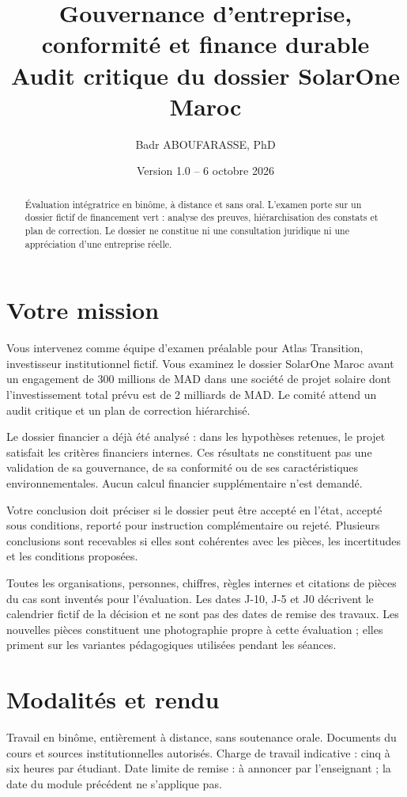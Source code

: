 \documentclass[11pt,a4paper]{article}
\title{\Large Gouvernance d’entreprise, conformité et finance durable\\[8pt]\LARGE Audit critique du dossier SolarOne Maroc}
\author{Badr ABOUFARASSE, PhD}
\date{Version 1.0 -- 6 octobre 2026}
\begin{document}
\maketitle
\begin{abstract}Évaluation intégratrice en binôme, à distance et sans oral. L’examen porte sur un dossier fictif de financement vert : analyse des preuves, hiérarchisation des constats et plan de correction. Le dossier ne constitue ni une consultation juridique ni une appréciation d’une entreprise réelle.\end{abstract}
\tableofcontents\newpage

\section{Votre mission}
Vous intervenez comme équipe d’examen préalable pour Atlas Transition, investisseur institutionnel fictif. Vous examinez le dossier SolarOne Maroc avant un engagement de 300 millions de MAD dans une société de projet solaire dont l’investissement total prévu est de 2 milliards de MAD. Le comité attend un audit critique et un plan de correction hiérarchisé.

Le dossier financier a déjà été analysé : dans les hypothèses retenues, le projet satisfait les critères financiers internes. Ces résultats ne constituent pas une validation de sa gouvernance, de sa conformité ou de ses caractéristiques environnementales. Aucun calcul financier supplémentaire n’est demandé.

Votre conclusion doit préciser si le dossier peut être accepté en l’état, accepté sous conditions, reporté pour instruction complémentaire ou rejeté. Plusieurs conclusions sont recevables si elles sont cohérentes avec les pièces, les incertitudes et les conditions proposées.

Toutes les organisations, personnes, chiffres, règles internes et citations de pièces du cas sont inventés pour l’évaluation. Les dates J-10, J-5 et J0 décrivent le calendrier fictif de la décision et ne sont pas des dates de remise des travaux. Les nouvelles pièces constituent une photographie propre à cette évaluation ; elles priment sur les variantes pédagogiques utilisées pendant les séances.

\section{Modalités et rendu}
Travail en binôme, entièrement à distance, sans soutenance orale. Documents du cours et sources institutionnelles autorisés. Charge de travail indicative : cinq à six heures par étudiant. Date limite de remise : à annoncer par l’enseignant ; la date du module précédent ne s’applique pas.
\end{document}
